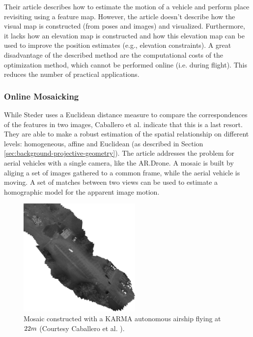 Their article describes how to estimate the motion of a vehicle and perform place revisiting using a feature map.
However, the article doesn't describe how the visual map is constructed (from poses and images) and visualized.
Furthermore, it lacks how an elevation map is constructed and how this elevation map can be used to improve the position estimates (e.g., elevation constraints).
A great disadvantage of the described method are the computational costs of the optimization method, which cannot be performed online (i.e. during flight). This reduces the number of practical applications.


\subsubsection{Online Mosaicking}
While Steder uses a Euclidean distance measure to compare the correspondences of the features in two images, Caballero et al. \cite{caballero2009unmanned} indicate that this is a last resort.
They are able to make a robust estimation of the spatial relationship on different levels: homogeneous, affine and Euclidean (as described in Section \ref{sec:background-projective-geometry}).
The article addresses the problem for aerial vehicles with a single camera, like the AR.Drone.
A mosaic is built by aliging a set of images gathered to a common frame, while the aerial vehicle is moving.
A set of matches between two views can be used to estimate a homographic model for the apparent image motion.

\begin{figure}[htb]
\centering
\includegraphics[width=6cm]{images/Caballero_map.png}
\caption{Mosaic constructed with a KARMA autonomous airship flying at $22\small{m}$ (Courtesy Caballero et al. \cite{caballero2009unmanned}).}
\label{fig:Caballero_map}
\end{figure}


